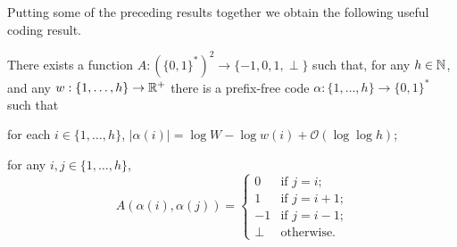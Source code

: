 \documentclass[kpfonts]{patmorin}
\newcommand{\Oh}{\mathcal{O}}
\begin{document}
\smallskip

Putting some of the preceding results together we obtain the following useful coding result.

\begin{lem}
  There exists a function $A:(\{0,1\}^*)^2\to\{-1,0,1,\perp\}$ such that, for any $h\in\mathbb{N}$, and any $w:\{1,\ldots,h\}\to\mathbb{R}^+$ there is a prefix-free code $\alpha:\{1,\ldots,h\}\to \{0,1\}^*$ such that
  \begin{compactenum}
    \item for each $i\in\{1,\ldots,h\}$, $|\alpha(i)|=\log W -\log w(i) + \Oh(\log\log h)$;
    \item for any $i,j\in\{1,\ldots,h\}$,
    \[   A(\alpha(i),\alpha(j))
    = \begin{cases}
       0 & \text{if $j=i$;}\\
       1 & \text{if $j=i+1$;} \\
       -1 & \text{if $j=i-1$;} \\
       \perp & \text{otherwise.}
      \end{cases}
      \]
    \end{compactenum}
\end{lem}
\end{document}

